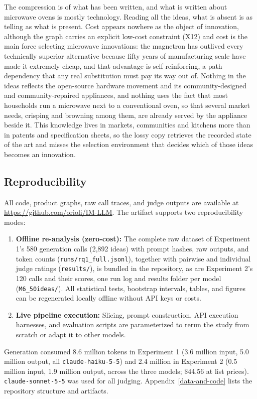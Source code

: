 The compression is of what has been written, and what is written about microwave ovens is mostly technology. Reading all the ideas, what is absent is as telling as what is present. Cost appears nowhere as the object of innovation, although the graph carries an explicit low-cost constraint (X12) and cost is the main force selecting microwave innovations: the magnetron has outlived every technically superior alternative because fifty years of manufacturing scale have made it extremely cheap, and that advantage is self-reinforcing, a path dependency that any real substitution must pay its way out of. Nothing in the ideas reflects the open-source hardware movement and its community-designed and community-repaired appliances, and nothing uses the fact that most households run a microwave next to a conventional oven, so that several market needs, crisping and browning among them, are already served by the appliance beside it. This knowledge lives in markets, communities and kitchens more than in patents and specification sheets, so the lossy copy retrieves the recorded state of the art and misses the selection environment that decides which of those ideas becomes an innovation.


\hypertarget{reproducibility}{%
\subsection{Reproducibility}\label{reproducibility}}
All code, product graphs, raw call traces, and judge outputs are available at \url{https://github.com/orioli/IM-LLM}. The artifact supports two reproducibility modes:
\begin{enumerate}
\tightlist
\item \textbf{Offline re-analysis (zero-cost):} The complete raw dataset of Experiment 1's 580 generation calls (2,892 ideas) with prompt hashes, raw outputs, and token counts (\texttt{runs/rq1\_full.jsonl}), together with pairwise and individual judge ratings (\texttt{results/}), is bundled in the repository, as are Experiment 2's 120 calls and their scores, one run log and results folder per model (\texttt{M6\_50ideas/}). All statistical tests, bootstrap intervals, tables, and figures can be regenerated locally offline without API keys or costs.
\item \textbf{Live pipeline execution:} Slicing, prompt construction, API execution harnesses, and evaluation scripts are parameterized to rerun the study from scratch or adapt it to other models.
\end{enumerate}
Generation consumed 8.6 million tokens in Experiment 1 (3.6 million input, 5.0 million output, all \texttt{claude-haiku-5-5}) and 2.4 million in Experiment 2 (0.5 million input, 1.9 million output, across the three models; \$44.56 at list prices). \texttt{claude-sonnet-5-5} was used for all judging. Appendix~\ref{data-and-code} lists the repository structure and artifacts.

